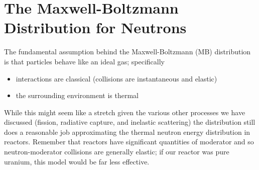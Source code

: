 \documentclass{report}
\begin{document}
\newpage
\section*{The Maxwell-Boltzmann Distribution for Neutrons} 

The fundamental assumption behind the Maxwell-Boltzmann (MB) distribution is that particles behave like an ideal gas; specifically
\begin{itemize}
\item interactions are classical (collisions are instantaneous and elastic)
\item the surrounding environment is thermal
\end{itemize}
While this might seem like a stretch given the various other processes we have discussed (fission, radiative capture, and inelastic scattering) the distribution still does a reasonable job approximating the thermal neutron energy distribution in reactors. Remember that reactors have significant quantities of moderator and so neutron-moderator collisions are generally elastic; if our reactor was pure uranium, this model would be far less effective.
\end{document}
